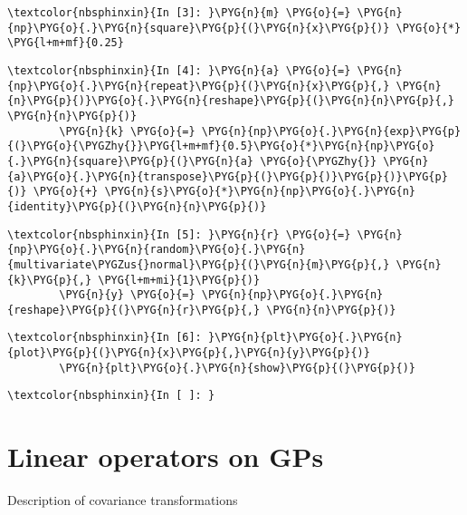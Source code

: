 \documentclass[letterpaper,10pt,english]{sphinxmanual}
\begin{document}
%
\begin{Verbatim}[commandchars=\\\{\}]
\textcolor{nbsphinxin}{In [3]: }\PYG{n}{m} \PYG{o}{=} \PYG{n}{np}\PYG{o}{.}\PYG{n}{square}\PYG{p}{(}\PYG{n}{x}\PYG{p}{)} \PYG{o}{*} \PYG{l+m+mf}{0.25}
\end{Verbatim}

%
\begin{Verbatim}[commandchars=\\\{\}]
\textcolor{nbsphinxin}{In [4]: }\PYG{n}{a} \PYG{o}{=} \PYG{n}{np}\PYG{o}{.}\PYG{n}{repeat}\PYG{p}{(}\PYG{n}{x}\PYG{p}{,} \PYG{n}{n}\PYG{p}{)}\PYG{o}{.}\PYG{n}{reshape}\PYG{p}{(}\PYG{n}{n}\PYG{p}{,} \PYG{n}{n}\PYG{p}{)}
        \PYG{n}{k} \PYG{o}{=} \PYG{n}{np}\PYG{o}{.}\PYG{n}{exp}\PYG{p}{(}\PYG{o}{\PYGZhy{}}\PYG{l+m+mf}{0.5}\PYG{o}{*}\PYG{n}{np}\PYG{o}{.}\PYG{n}{square}\PYG{p}{(}\PYG{n}{a} \PYG{o}{\PYGZhy{}} \PYG{n}{a}\PYG{o}{.}\PYG{n}{transpose}\PYG{p}{(}\PYG{p}{)}\PYG{p}{)}\PYG{p}{)} \PYG{o}{+} \PYG{n}{s}\PYG{o}{*}\PYG{n}{np}\PYG{o}{.}\PYG{n}{identity}\PYG{p}{(}\PYG{n}{n}\PYG{p}{)}
\end{Verbatim}

%
\begin{Verbatim}[commandchars=\\\{\}]
\textcolor{nbsphinxin}{In [5]: }\PYG{n}{r} \PYG{o}{=} \PYG{n}{np}\PYG{o}{.}\PYG{n}{random}\PYG{o}{.}\PYG{n}{multivariate\PYGZus{}normal}\PYG{p}{(}\PYG{n}{m}\PYG{p}{,} \PYG{n}{k}\PYG{p}{,} \PYG{l+m+mi}{1}\PYG{p}{)}
        \PYG{n}{y} \PYG{o}{=} \PYG{n}{np}\PYG{o}{.}\PYG{n}{reshape}\PYG{p}{(}\PYG{n}{r}\PYG{p}{,} \PYG{n}{n}\PYG{p}{)}
\end{Verbatim}

%
\begin{Verbatim}[commandchars=\\\{\}]
\textcolor{nbsphinxin}{In [6]: }\PYG{n}{plt}\PYG{o}{.}\PYG{n}{plot}\PYG{p}{(}\PYG{n}{x}\PYG{p}{,}\PYG{n}{y}\PYG{p}{)}
        \PYG{n}{plt}\PYG{o}{.}\PYG{n}{show}\PYG{p}{(}\PYG{p}{)}
\end{Verbatim}

\noindent{}

%
\begin{Verbatim}[commandchars=\\\{\}]
\textcolor{nbsphinxin}{In [ ]: }
\end{Verbatim}


\chapter{Linear operators on GPs}
\label{\detokenize{report/3-linear_op_gp:linear-operators-on-gps}}\label{\detokenize{report/3-linear_op_gp::doc}}
Description of covariance transformations
\end{document}
